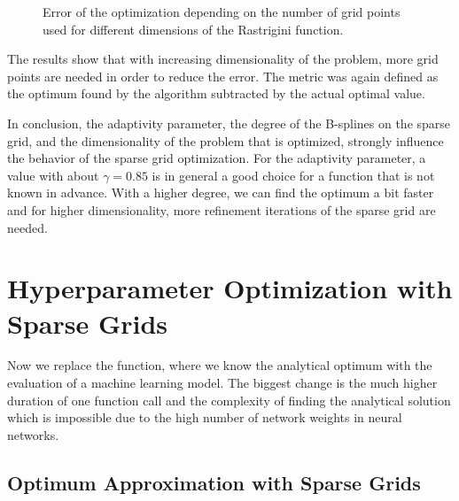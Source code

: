 \begin{figure}[H]
	\caption{ Error of the optimization depending on the number of grid points used for different dimensions of the Rastrigini function. }	
	\label{fig:Dimensions_results}
\end{figure}

The results show that with increasing dimensionality of the problem, more grid points are needed in order to reduce the error. The metric was again defined as the optimum found by the algorithm subtracted by the actual optimal value. \newline 

In conclusion, the adaptivity parameter, the degree of the B-splines on the sparse grid, and the dimensionality of the problem that is optimized, strongly influence the behavior of the sparse grid optimization. For the adaptivity parameter, a value with about $ \gamma = 0.85 $ is in general a good choice for a function that is not known in advance. With a higher degree, we can find the optimum a bit faster and for higher dimensionality, more refinement iterations of the sparse grid are needed. 


\section{Hyperparameter Optimization with Sparse Grids}

Now we replace the function, where we know the analytical optimum with the evaluation of a machine learning model. The biggest change is the much higher duration of one function call and the complexity of finding the analytical solution which is impossible due to the high number of network weights in neural networks. 

\subsection{Optimum Approximation with Sparse Grids}

